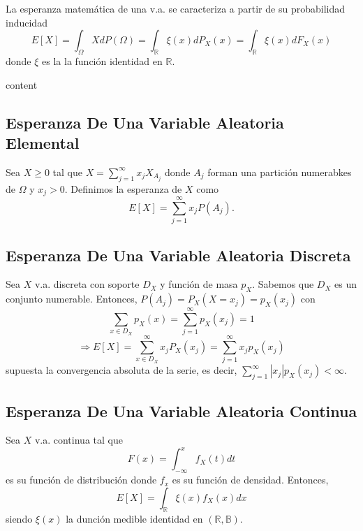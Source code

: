 \begin{theo}
  La esperanza matemática de una v.a. se caracteriza a partir de su probabilidad inducidad
  \[ 
    E [X]  = \int_{\Omega}^{} X dP(\Omega) = \int_{\mathbb{R}}^{} \xi(x) dP_{X}(x) = \int_{\mathbb{R}}^{} \xi(x) dF_{X}(x)
  \] 
  donde $\xi $ es la la función identidad en $\mathbb{R}$.
\end{theo}

\begin{dem}
  content
\end{dem}

\subsection{Esperanza De Una Variable Aleatoria Elemental}

\begin{defn}
  Sea $X \geq 0$ tal que $X = \sum_{j = 1}^{\infty} x_{j} X_{A_{j}}$ donde $A_{j}$ forman una partición numerabkes de $\Omega$ y $x_{j} >0$. Definimos la esperanza de $X$ como
  \[ 
    E [ X ] = \sum_{j = 1}^{\infty} x_{j} P(A_{j}).
  \] 
\end{defn}

\subsection{Esperanza De Una Variable Aleatoria Discreta}

\begin{prop}
  Sea $X$ v.a. discreta con soporte $D_{X}$ y función de masa $p_{X}$. Sabemos que $D_{X}$ es un conjunto numerable. Entonces, $P(A_{j}) = P_{X}(X = x_{j}) = p_{X}(x_{j})$ con
  \[ 
    \sum_{x \in D_{X}} p_{X}(x) = \sum_{j = 1}^{\infty} p_{X}(x_{j}) = 1 
\] 
  \[ 
    \Rightarrow E [ X ] = \sum_{x \in D_{X}}^{\infty} x_{j} P_{X}(x_{j}) = \sum_{j = 1}^{\infty} x_{j} p_{X}(x_{j}) 
  \] 
  supuesta la convergencia absoluta de la serie, es decir, $\sum_{j = 1}^{\infty} | x_{j} | p_{X}(x_{j}) < \infty$.
\end{prop}

\subsection{Esperanza De Una Variable Aleatoria Continua}

\begin{defn}
  Sea $X$ v.a. continua tal que
  \[ 
    F(x) = \int_{-\infty}^{x} f_{X}(t) dt 
  \] 
  es su función de distribución donde $f_{x}$ es su función de densidad. Entonces,
  \[ 
    E[X] = \int_{\mathbb{R}}^{} \xi(x) f_{X}(x) dx
  \] 
  siendo $\xi(x)$ la dunción medible identidad en $( \mathbb{R}, \mathbb{B})$.
\end{defn}

